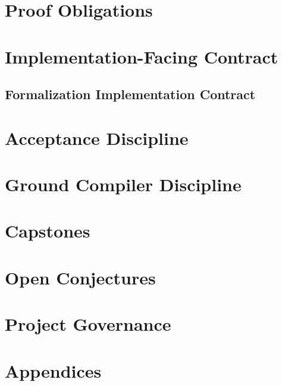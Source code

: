 \documentclass[11pt,oneside,openany]{book}
\begin{document}
\part{Proof Obligations}


\part{Implementation-Facing Contract}
\chapter{Formalization Implementation Contract}

\part{Acceptance Discipline}

\part{Ground Compiler Discipline}


\part{Capstones}

\part{Open Conjectures}

\part{Project Governance}

\appendix
\part{Appendices}


\end{document}
